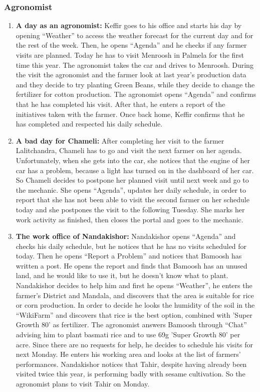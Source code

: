 \subsubsection{Agronomist}
\begin{enumerate}[label=\textbf{A.\arabic*}]
    \item\textbf{A day as an agronomist: }Keffir goes to his office and starts his day by opening “Weather” to access the weather forecast for the current day and for the rest of the week. Then, he opens “Agenda” and he checks if any farmer visits are planned. Today he has to visit Menroosh in Palmela for the first time this year. The agronomist takes the car and drives to Menroosh. During the visit the agronomist and the farmer look at last year's production data and they decide to try planting Green Beans, while they decide to change the fertilizer for cotton production. The agronomist opens “Agenda” and confirms that he has completed his visit. After that, he enters a report of the initiatives taken with the farmer. Once back home, Keffir confirms that he has completed and respected his daily schedule.
    \item\textbf{A bad day for Chameli: }After completing her visit to the farmer Lalitchandra, Chameli has to go and visit the next farmer on her agenda. Unfortunately, when she gets into the car, she notices that the engine of her car has a problem, because a light has turned on in the dashboard of her car. So Chameli decides to postpone her planned visit until next week and go to the mechanic. She opens “Agenda”, updates her daily schedule, in order to report that she has not been able to visit the second farmer on her schedule today and she postpones the visit to the following Tuesday. She marks her work activity as finished, then closes the portal and goes to the mechanic.
    \item\textbf{The work office of Nandakishor: }Nandakishor opens “Agenda” and checks his daily schedule, but he notices that he has no visits scheduled for today. Then he opens “Report a Problem” and notices that Bamoosh has written a post. He opens the report and finds that Bamoosh has an unused land, and he would like to use it, but he doesn't know what to plant. Nandakishor decides to help him and first he opens “Weather”, he enters the farmer's District and Mandala, and discovers that the area is suitable for rice or corn production. In order to decide he looks the humidity of the soil in the “WikiFarm” and discovers that rice is the best option, combined with 'Super Growth 80' as fertilizer. The agronomist answers Bamoosh through “Chat” advising him to plant basmati rice and to use 69g 'Super Growth 80' per acre. Since there are no requests for help, he decides to schedule his visits for next Monday. He enters his working area and looks at the list of farmers' performances. Nandakishor notices that Tahir, despite having already been visited twice this year, is performing badly with sesame cultivation. So the agronomist plans to visit Tahir on Monday.
\end{enumerate}

